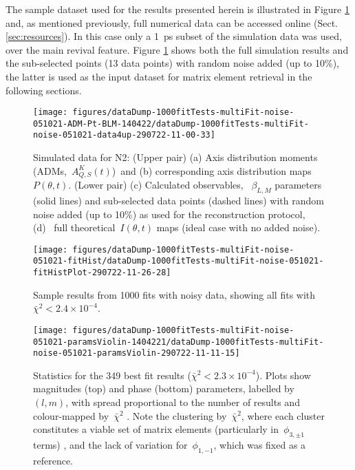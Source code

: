 \documentclass[10pt]{article}
\begin{document}
The sample dataset used for the results presented herein is illustrated in Figure \ref{720080} and, as mentioned previously, full numerical data can be accessed online (Sect. \ref{sec:resources}). In this case only a 1~ps subset of the simulation data was used, over the main revival feature. Figure \ref{720080} shows both the full simulation results and the sub-selected points (13 data points) with random noise added (up to 10\%), the latter is used as the input dataset for matrix element retrieval in the following sections. %
\begin{figure}[H]
\begin{center}
\texttt{[image: figures/dataDump-1000fitTests-multiFit-noise-051021-ADM-Pt-BLM-140422/dataDump-1000fitTests-multiFit-noise-051021-data4up-290722-11-00-33]}
\caption{{Simulated data for N2: (Upper pair) (a) Axis distribution moments
(ADMs,~\(A^{K}_{Q,S}(t)\))~and (b) corresponding axis distribution
maps~\(P(\theta, t)\). (Lower pair) (c) Calculated observables,
~\(\beta_{L,M}\) parameters (solid lines) and sub-selected data
points (dashed lines) with random noise added (up to 10\%) as used for
the reconstruction protocol, (d)~ full theoretical~\(I(\theta,t)\)
maps (ideal case with no added noise).
{\label{720080}}%
}}
\end{center}
\end{figure}
\begin{figure}[H]
\begin{center}
\texttt{[image: figures/dataDump-1000fitTests-multiFit-noise-051021-fitHist/dataDump-1000fitTests-multiFit-noise-051021-fitHistPlot-290722-11-26-28]}
\caption{{Sample results from 1000 fits with noisy data, showing all fits with
\(\bar{\chi}^2 < 2.4\times10^{-4}\).
{\label{509194}}%
}}
\end{center}
\end{figure}
\begin{figure}[H]
\begin{center}
\texttt{[image: figures/dataDump-1000fitTests-multiFit-noise-051021-paramsViolin-1404221/dataDump-1000fitTests-multiFit-noise-051021-paramsViolin-290722-11-11-15]}
\caption{{Statistics for the 349 best fit results (\(\bar{\chi}^2 < 2.3 \times 10^{-4}\)). Plots show
magnitudes (top) and phase (bottom) parameters, labelled
by~\((l,m)\), with spread proportional to the number of results
and colour-mapped by~\(\bar{\chi}^2\) . Note the clustering
by~\(\bar{\chi}^2\), where each cluster constitutes a viable set of
matrix elements (particularly in~\(\phi_{3,\pm1}\) terms) , and the
lack of variation for~\(\phi_{1,-1}\), which was fixed as a
reference.
{\label{494229}}%
}}
\end{center}
\end{figure}
\end{document}
